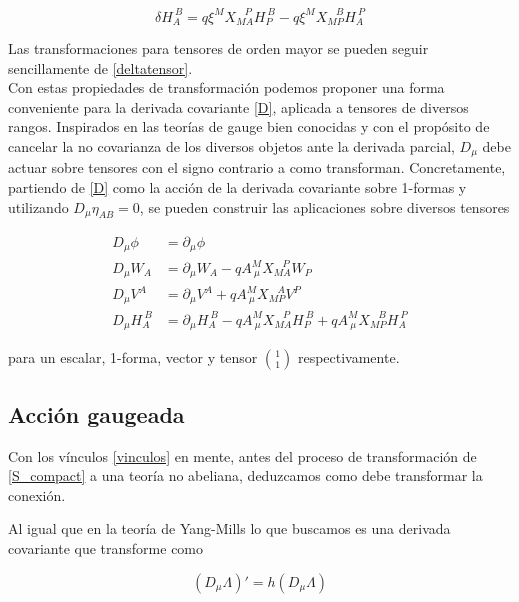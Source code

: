\documentclass{article}
\numberwithin{equation}{section}
\begin{document}
\begin{equation}\label{deltatensor}
\delta H_A^{\ B} = q \xi^M X_{M A}^{\ \ \ \ P} H_P^{\ B} -q \xi^M X_{M P}^{\ \ \ \ B} H_A^{\ P}
\end{equation}

Las transformaciones para tensores de orden mayor se pueden seguir sencillamente de \ref{deltatensor}.\\

Con estas propiedades de transformación podemos proponer una forma conveniente para la derivada covariante \ref{D}, aplicada a tensores de diversos rangos. Inspirados en las teorías de gauge bien conocidas y con el propósito de cancelar la no covarianza de los diversos objetos ante la derivada parcial, $ D_{\mu} $ debe actuar sobre tensores con el signo contrario a como transforman. Concretamente, partiendo de \ref{D} como la acción de la derivada covariante sobre 1-formas y utilizando $ D_{\mu} \eta_{A B} = 0 $, se pueden construir las aplicaciones sobre diversos tensores

\begin{equation}\label{Dindices}
\begin{aligned}
D_{\mu} \phi &= \partial_{\mu} \phi\\
D_{\mu} W_A &= \partial_{\mu} W_A - q A^M_{\ \mu} X_{M A}^{\ \ \ \ P} W_P\\
D_{\mu} V^A &= \partial_{\mu} V^A + q A^M_{\ \mu} X_{M P}^{\ \ \ \ A} V^P\\
D_{\mu} H_A^{\ B} &= \partial_{\mu} H_A^{\ B} - q A^M_{\ \mu} X_{M A}^{\ \ \ \ P} H_P^{\ B} + q A^M_{\ \mu} X_{M P}^{\ \ \ \ B} H_A^{\ P}
\end{aligned}
\end{equation}

para un escalar, 1-forma, vector y tensor $ \binom{1}{1} $ respectivamente. 

\subsection{Acción gaugeada}

Con los vínculos \ref{vinculos} en mente, antes del proceso de transformación de \ref{S_compact} a una teoría no abeliana, deduzcamos como debe transformar la conexión. 

Al igual que en la teoría de Yang-Mills lo que buscamos es una derivada covariante que transforme como

\begin{equation}\label{Dcovariante}
\left(D_{\mu} \Lambda\right)' =  h \left( D_{\mu} \Lambda\right) 
\end{equation} 
\end{document}
